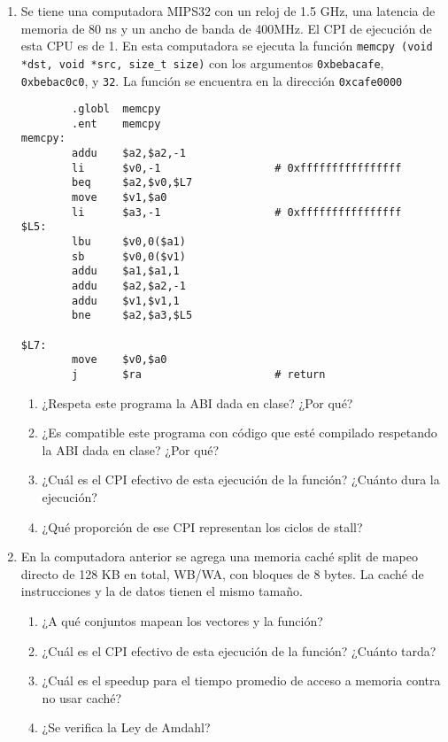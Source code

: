 \documentclass{article}
\begin{document}
\pagestyle{fancyplain}

\cfoot{}
\rfoot{}

\begin{enumerate}
\item	Se tiene una computadora MIPS32 con un reloj de 1.5 GHz, una latencia de memoria de 80 ns y un ancho de banda de 400MHz. El CPI de ejecución de esta CPU es de 1. En esta computadora se ejecuta la función \texttt{memcpy (void *dst, void *src, size\_t size)} con los argumentos \texttt{0xbebacafe}, \texttt{0xbebac0c0}, y \texttt{32}. La función se encuentra en la dirección \texttt{0xcafe0000}

\begin{verbatim}
        .globl  memcpy
        .ent    memcpy
memcpy:
        addu    $a2,$a2,-1
        li      $v0,-1                  # 0xffffffffffffffff
        beq     $a2,$v0,$L7
        move    $v1,$a0
        li      $a3,-1                  # 0xffffffffffffffff
$L5:
        lbu     $v0,0($a1)
        sb      $v0,0($v1)
        addu    $a1,$a1,1
        addu    $a2,$a2,-1
        addu    $v1,$v1,1
        bne     $a2,$a3,$L5

$L7:
        move    $v0,$a0
        j       $ra                     # return
\end{verbatim}
\begin{enumerate}
\item ¿Respeta este programa la ABI dada en clase? ¿Por qué?
\item ¿Es compatible este programa con código que esté compilado respetando la ABI dada en clase? ¿Por qué?
\item ¿Cuál es el CPI efectivo de esta ejecución de la función? ¿Cuánto dura la ejecución?
\item ¿Qué proporción de ese CPI representan los ciclos de stall?
\end{enumerate}
\item En la computadora anterior se agrega una memoria caché split de mapeo directo de 128 KB en total, WB/WA, con bloques de 8 bytes. La caché de instrucciones y la de datos tienen el mismo tamaño. 
\begin{enumerate}
\item ¿A qué conjuntos mapean los vectores y la función?
\item ¿Cuál es el CPI efectivo de esta ejecución de la función? ¿Cuánto tarda?
\item ¿Cuál es el speedup para el tiempo promedio de acceso a memoria contra no usar caché?
\item ¿Se verifica la Ley de Amdahl?
\end{enumerate}



\end{enumerate}
\end{document}

